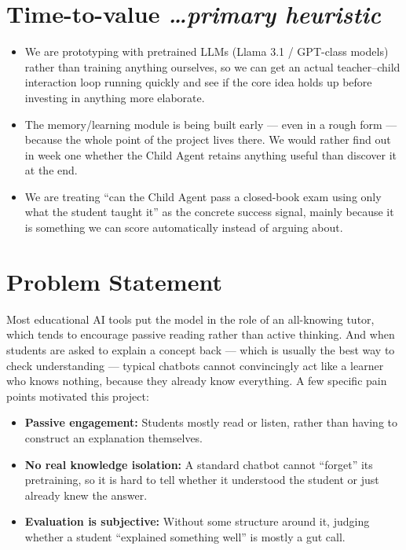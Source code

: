 \documentclass[11pt,a4paper]{article}
\newcommand{\mysection}[2]{%
    \section[#1]{#1 \hfill {\normalfont\itshape #2}}
}
\begin{document}
\mysection{Time-to-value}{\ldots primary heuristic}

\begin{itemize}

    \item We are prototyping with pretrained LLMs (Llama 3.1 / GPT-class models) rather than training anything ourselves, so we can get an actual teacher--child interaction loop running quickly and see if the core idea holds up before investing in anything more elaborate.

    \item The memory/learning module is being built early --- even in a rough form --- because the whole point of the project lives there. We would rather find out in week one whether the Child Agent retains anything useful than discover it at the end.

    \item We are treating ``can the Child Agent pass a closed-book exam using only what the student taught it'' as the concrete success signal, mainly because it is something we can score automatically instead of arguing about.

\end{itemize}


\mysection{Problem Statement}{}

Most educational AI tools put the model in the role of an all-knowing tutor, which tends to encourage passive reading rather than active thinking. And when students are asked to explain a concept back --- which is usually the best way to check understanding --- typical chatbots cannot convincingly act like a learner who knows nothing, because they already know everything. A few specific pain points motivated this project:

\begin{itemize}

    \item \textbf{Passive engagement:} Students mostly read or listen, rather than having to construct an explanation themselves.

    \item \textbf{No real knowledge isolation:} A standard chatbot cannot ``forget'' its pretraining, so it is hard to tell whether it understood the student or just already knew the answer.

    \item \textbf{Evaluation is subjective:} Without some structure around it, judging whether a student ``explained something well'' is mostly a gut call.

\end{itemize}
\end{document}
